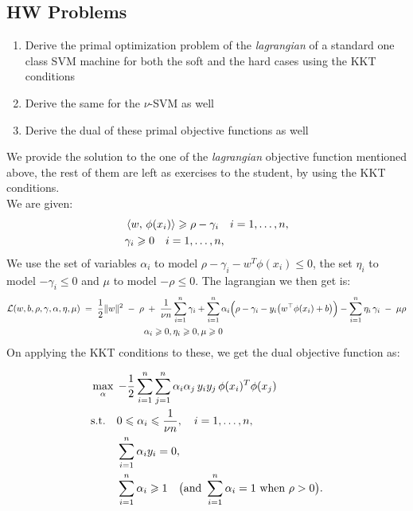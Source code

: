 \documentclass[11pt]{report}
\begin{document}
\subsection{HW Problems}
\begin{enumerate}
    \item Derive the primal optimization problem of the \emph{lagrangian} of a standard one class SVM machine for both the soft and the hard cases using the KKT conditions
    \item Derive the same for the \(\nu\)-SVM as well
    \item Derive the dual of these primal objective functions as well
\end{enumerate}
\vspace{1mm}
We provide the solution to the one of the \emph{lagrangian} objective function mentioned above, the rest of them are left as exercises to the student, by using the KKT conditions.\\
We are given:
\begin{align}
    & \left\langle{w},\,{\phi(x_i)}\right\rangle \geqslant \rho - \gamma_i \quad i=1,\ldots,n, \nonumber \\
    & \gamma_i \geqslant 0 \quad i=1,\ldots,n, \nonumber
\end{align}
We use the set of variables \(\alpha_i\) to model \(\rho - \gamma_i - w^T\phi(x_i) \leq 0\), the set \(\eta_i\) to model \(-\gamma_i \leq 0\) and \(\mu\) to model \(-\rho \leq 0\). The lagrangian we then get is:
\begin{align}
     \mathcal{L}(w,b,\rho,\gamma,\alpha,\eta,\mu) \;=\;
\frac{1}{2}\|w\|^2 \;-\; \rho & \;+\; \frac{1}{\nu n} \sum_{i=1}^n \gamma_i
+ \sum_{i=1}^n \alpha_i \Big( \rho - \gamma_i - y_i \big( w^\top \phi(x_i) + b \big) \Big)
- \sum_{i=1}^n \eta_i \, \gamma_i \;-\; \mu \rho \nn \\
    \vspace{1mm}
    & \alpha_i \geq 0, \eta_i \geq 0, \mu \geq 0 \nn
\end{align}
\vspace{1mm}
On applying the KKT conditions to these, we get the dual objective function as:

\begin{align}
    & \max_{\alpha}\;
-\frac{1}{2}\sum_{i=1}^n\sum_{j=1}^n
    \alpha_i \alpha_j\, y_i y_j\, \phi(x_i)^T\phi(x_j) \nonumber \\
    & \begin{aligned}
\text{s.t.}\quad
& 0 \leqslant \alpha_i \leqslant \frac{1}{\nu n}, \quad i=1,\dots,n,\\
& \sum_{i=1}^n \alpha_i y_i = 0,\\
& \sum_{i=1}^n \alpha_i \geqslant 1
\quad\big(\text{and } \sum_{i=1}^n \alpha_i = 1 \text{ when } \rho>0\big).
\end{aligned} \nonumber 
\end{align}
\end{document}
